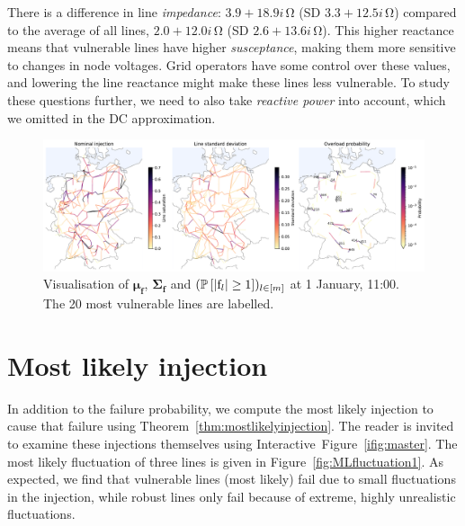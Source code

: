 \documentclass[main.tex]{subfiles}
\begin{document}
There is a difference in line \emph{impedance}: $3.9 + 18.9i \, \si{\ohm}$ (SD $3.3 + 12.5i \, \si{\ohm}$) compared to the average of all lines, $2.0 + 12.0i \, \si{\ohm}$ (SD $2.6 + 13.6i \, \si{\ohm}$). This higher reactance means that vulnerable lines have higher \emph{susceptance}, making them more sensitive to changes in node voltages. Grid operators have some control over these values, and lowering the line reactance might make these lines less vulnerable. To study these questions further, we need to also take \emph{reactive power} into account, which we omitted in the DC approximation.

\begin{figure}
    \centering
    \includegraphics[width=\textwidth]{img/nomflow_stdev_trueoverloadprob_labeled.pdf}
    \caption{Visualisation of $\bm{\mu}_{\mathbf{f}}$, $\bm{\Sigma}_{\mathbf{f}}$ and $(\operatorname{\mathbb{P}}\left[|{\mathrm{f}}_l| \geq 1 \right])_{l \in [m]}$ at 1 January, 11:00. The 20 most vulnerable lines are labelled.}
    \label{fig:nomflow_stdev_overload}
\end{figure}

\section{Most likely injection}
In addition to the failure probability, we compute the most likely injection to cause that failure using Theorem~\ref{thm:mostlikelyinjection}. The reader is invited to examine these injections themselves using Interactive~Figure~\ref{ifig:master}. The most likely fluctuation of three lines is given in Figure~\ref{fig:MLfluctuation1}. As expected, we find that vulnerable lines (most likely) fail due to small fluctuations in the injection, while robust lines only fail because of extreme, highly unrealistic fluctuations. 
\end{document}
